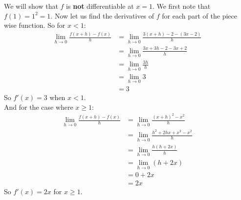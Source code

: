 \documentclass[12pt,letterpaper]{article}
\theoremstyle{case}
\theoremstyle{definition}
\begin{document}
\begin{enumerate}
\begin{enumerate}
			We will show that $f$ is \textbf{not} differentiable at $x=1$. We first note that $f(1)=1^2=1$. Now let us find the derivatives of $f$ for each part of the piece wise function. So for $x<1$:
			\begin{align*}
				\lim\limits_{h \to 0} \frac{f(x+h)-f(x)}{h} &= \lim\limits_{h \to 0} \frac{3(x+h)-2-(3x-2)}{h} \\
				&= \lim\limits_{h \to 0} \frac{3x+3h-2-3x+2}{h} \\
				&= \lim\limits_{h \to 0} \frac{3h}{h} \\
				&= \lim\limits_{h \to 0} 3 \\
				&= 3
			\end{align*}
			So $f'(x)=3$ when $x<1$.\\
			
			And for the case where $x \geq 1$:
			\begin{align*}
				\lim\limits_{h \to 0} \frac{f(x+h)-f(x)}{h} &= \lim\limits_{h \to 0} \frac{(x+h)^2-x^2}{h} \\
				&= \lim\limits_{h \to 0} \frac{h^2+2hx+x^2-x^2}{h} \\
				&= \lim\limits_{h \to 0} \frac{h(h+2x)}{h} \\
				&= \lim\limits_{h \to 0} (h+2x) \\
				&= 0+2x \\
				&=2x
			\end{align*}
			So $f'(x)=2x$ for $x \geq 1$.\\
			

\end{enumerate}
\end{enumerate}
\end{document}
